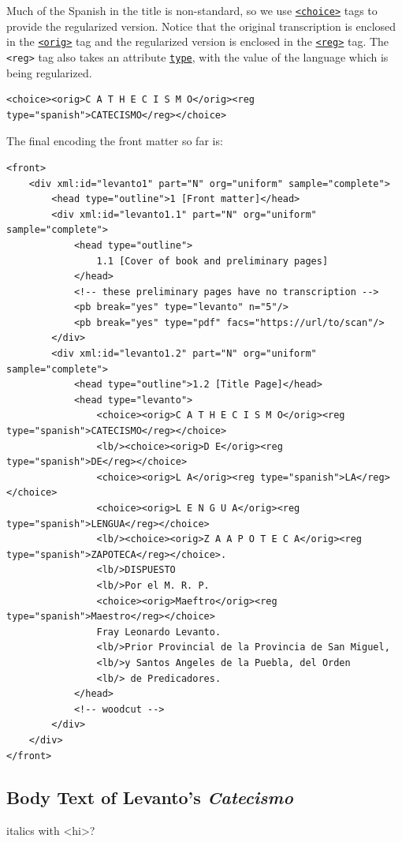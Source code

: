 \documentclass[12pt,a4paper]{article}
\begin{document}
Much of the Spanish in the title is non-standard, so we use \hyperref[tag-sec:choice]{\texttt{<choice>}} tags to provide the regularized version.  Notice that the original transcription is enclosed in the \hyperref[tag-sec:orig]{\texttt{<orig>}} tag and the regularized version is enclosed in the \hyperref[tag-sec:reg]{\texttt{<reg>}} tag.  The \texttt{<reg>} tag also takes an attribute \hyperref[att-sec:type]{\texttt{type}}, with the value of the language which is being regularized.

\begin{lstlisting}
<choice><orig>C A T H E C I S M O</orig><reg type="spanish">CATECISMO</reg></choice>
\end{lstlisting}

The final encoding the front matter so far is:

\begin{lstlisting}
<front>
	<div xml:id="levanto1" part="N" org="uniform" sample="complete"> 
		<head type="outline">1 [Front matter]</head>
		<div xml:id="levanto1.1" part="N" org="uniform" sample="complete">
			<head type="outline">
				1.1 [Cover of book and preliminary pages]
			</head>
			<!-- these preliminary pages have no transcription -->
			<pb break="yes" type="levanto" n="5"/>
			<pb break="yes" type="pdf" facs="https://url/to/scan"/>
		</div>
		<div xml:id="levanto1.2" part="N" org="uniform" sample="complete">
			<head type="outline">1.2 [Title Page]</head>  
			<head type="levanto">
				<choice><orig>C A T H E C I S M O</orig><reg type="spanish">CATECISMO</reg></choice>
				<lb/><choice><orig>D E</orig><reg type="spanish">DE</reg></choice> 
				<choice><orig>L A</orig><reg type="spanish">LA</reg></choice> 
				<choice><orig>L E N G U A</orig><reg type="spanish">LENGUA</reg></choice>
				<lb/><choice><orig>Z A A P O T E C A</orig><reg type="spanish">ZAPOTECA</reg></choice>.
				<lb/>DISPUESTO
				<lb/>Por el M. R. P.
				<choice><orig>Maeftro</orig><reg type="spanish">Maestro</reg></choice> 
				Fray Leonardo Levanto.
				<lb/>Prior Provincial de la Provincia de San Miguel,
				<lb/>y Santos Angeles de la Puebla, del Orden
				<lb/> de Predicadores.
			</head>
			<!-- woodcut -->
		</div>
	</div>
</front>
\end{lstlisting}

\subsection{Body Text of Levanto's \emph{Catecismo}}

italics with <hi>?
\end{document}
